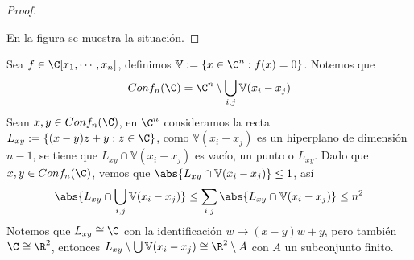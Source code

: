 \documentclass{article}
\begin{document}
\begin{proof}
\begin{center}
    \end{center}
    En la figura se muestra la situación.
\end{proof}

\noindent Sea $f\in\C[x_{1},\cdots,x_{n}]$, definimos $\mathbb{V}:=\{x\in\C^{n}:f(x)=0\}$. Notemos 
que
\begin{equation*}
    Conf_{n}(\C)=\C^{n}\setminus\bigcup_{i,j}\mathbb{V}(x_{i}-x_{j})
\end{equation*}
Sean $x,y\in Conf_{n}(\C)$, en $\C^{n}$ consideramos la recta $L_{xy}:=\{(x-y)z+y:z\in\C\}$, como
$\mathbb{V}(x_{i}-x_{j})$ es un hiperplano de dimensión $n-1$, se tiene que 
$L_{xy}\cap\mathbb{V}(x_{i}-x_{j})$ es vacío, un punto o $L_{xy}$. Dado que $x,y\in Conf_{n}(\C)$, 
vemos que $\abs{L_{xy}\cap\mathbb{V}(x_{i}-x_{j})}\leq1$, así
\begin{equation*}
    \abs{L_{xy}\cap\bigcup_{i,j}\mathbb{V}(x_{i}-x_{j})}\leq\sum_{i,j}\abs{L_{xy}
    \cap\mathbb{V}(x_{i}-x_{j})}\leq n^{2}
\end{equation*}
Notemos que $L_{xy}\cong\C$ con la identificación $w\to(x-y)w+y$, pero también $\C\cong\R^{2}$, 
entonces $L_{xy}\setminus\bigcup\mathbb{V}(x_{i}-x_{j})\cong\R^{2}\setminus A$ con $A$ un 
subconjunto finito.
\end{document}
